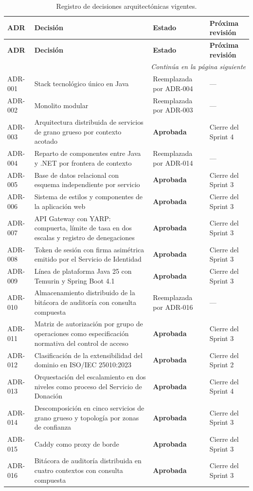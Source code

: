 \documentclass[11pt,a4paper]{article}
\newcommand{\contlinea}[1]{\multicolumn{#1}{r}{\footnotesize\itshape Continúa en la página siguiente}}
\begin{document}
\begin{longtable}{L{1.6cm} L{5.6cm} L{3.2cm} L{3.4cm}}
\caption{Registro de decisiones arquitectónicas vigentes.}\label{tab:adrs}\\
\toprule
\textbf{ADR} & \textbf{Decisión} & \textbf{Estado} & \textbf{Próxima revisión} \\
\midrule
\endfirsthead
\toprule
\textbf{ADR} & \textbf{Decisión} & \textbf{Estado} & \textbf{Próxima revisión} \\
\midrule
\endhead
\midrule
\contlinea{4} \\
\endfoot
\bottomrule
\endlastfoot
ADR-001 & Stack tecnológico único en Java & Reemplazada por ADR-004 & --- \\
ADR-002 & Monolito modular & Reemplazada por ADR-003 & --- \\
ADR-003 & Arquitectura distribuida de servicios de grano grueso por contexto acotado & \textbf{Aprobada} & Cierre del Sprint 4 \\
ADR-004 & Reparto de componentes entre Java y .NET por frontera de contexto & Reemplazada por ADR-014 & --- \\
ADR-005 & Base de datos relacional con esquema independiente por servicio & \textbf{Aprobada} & Cierre del Sprint 3 \\
ADR-006 & Sistema de estilos y componentes de la aplicación web & \textbf{Aprobada} & Cierre del Sprint 3 \\
ADR-007 & API Gateway con YARP: compuerta, límite de tasa en dos escalas y registro de denegaciones & \textbf{Aprobada} & Cierre del Sprint 3 \\
ADR-008 & Token de sesión con firma asimétrica emitido por el Servicio de Identidad & \textbf{Aprobada} & Cierre del Sprint 3 \\
ADR-009 & Línea de plataforma Java 25 con Temurin y Spring Boot 4.1 & \textbf{Aprobada} & Cierre del Sprint 3 \\
ADR-010 & Almacenamiento distribuido de la bitácora de auditoría con consulta compuesta & Reemplazada por ADR-016 & --- \\
ADR-011 & Matriz de autorización por grupo de operaciones como especificación normativa del control de acceso & \textbf{Aprobada} & Cierre del Sprint 3 \\
ADR-012 & Clasificación de la extensibilidad del dominio en ISO/IEC 25010:2023 & \textbf{Aprobada} & Cierre del Sprint 2 \\
ADR-013 & Orquestación del escalamiento en dos niveles como proceso del Servicio de Donación & \textbf{Aprobada} & Cierre del Sprint 4 \\
ADR-014 & Descomposición en cinco servicios de grano grueso y topología por zonas de confianza & \textbf{Aprobada} & Cierre del Sprint 3 \\
ADR-015 & Caddy como proxy de borde & \textbf{Aprobada} & Cierre del Sprint 3 \\
ADR-016 & Bitácora de auditoría distribuida en cuatro contextos con consulta compuesta & \textbf{Aprobada} & Cierre del Sprint 3 \\
\end{longtable}
\end{document}
